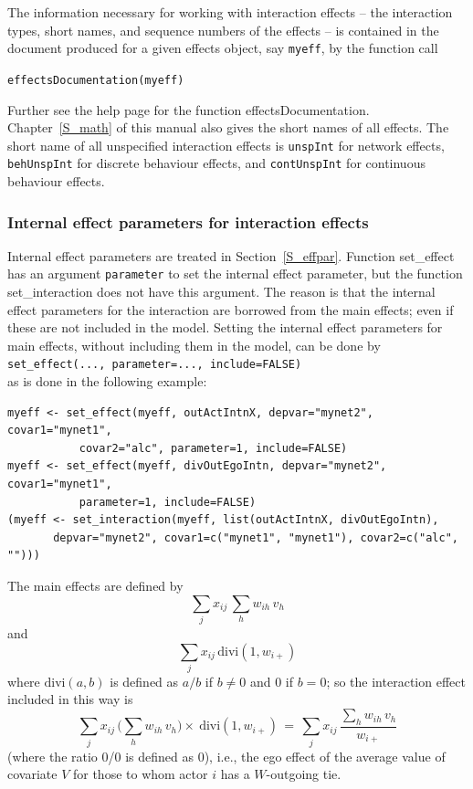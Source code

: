 \documentclass[a4paper,fleqn,11pt]{article}
\newcommand{\+}{\, + \,}
\newcommand{\sfn}[1]{\textsf{#1}}
\begin{document}
The information necessary for working with interaction effects
-- the interaction types, short names, and sequence numbers
of the effects -- is contained in the document produced
for a given effects object, say \texttt{myeff}, by the function call

\verb|effectsDocumentation(myeff)|

\noindent
Further see the help page for the function \sfn{effectsDocumentation}.
Chapter~\ref{S_math} of this manual also gives the short names of all effects.
The short name of all unspecified interaction effects is \texttt{unspInt}
for network effects, \texttt{behUnspInt} for discrete behaviour effects,
and \texttt{contUnspInt} for continuous behaviour effects.



\subsubsection{Internal effect parameters for interaction effects}
\label{intint}

Internal effect parameters are treated in Section~\ref{S_effpar}.
Function \sfn{set\_effect} has an argument \texttt{parameter} to set the
internal effect parameter, but the function  \sfn{set\_interaction} does not
have this argument. The reason is that the internal effect parameters for the
interaction are borrowed from the main effects; even if these are
not included in the model.
Setting the internal effect parameters for main effects, without including them
in the model, can be done by \\[0.2em]
\texttt{set\_effect(..., parameter=..., include=FALSE)}\\[0.2em]
 as is done in the following example:
\begin{verbatim}
myeff <- set_effect(myeff, outActIntnX, depvar="mynet2", covar1="mynet1",
           covar2="alc", parameter=1, include=FALSE)
myeff <- set_effect(myeff, divOutEgoIntn, depvar="mynet2", covar1="mynet1",
           parameter=1, include=FALSE)
(myeff <- set_interaction(myeff, list(outActIntnX, divOutEgoIntn),
       depvar="mynet2", covar1=c("mynet1", "mynet1"), covar2=c("alc", "")))
\end{verbatim}
The main effects are defined by
\[
\sum_j x_{ij}\, \sum_h w_{ih}\,v_h
\] and
\[
  \sum_j x_{ij}\, \text{divi}(1, w_{i+})
\]
where $\text{divi}(a,b)$ is defined as $a/b$ if $b \neq 0$ and 0 if $b=0$;
so the interaction effect included in this way is
\[
\sum_j x_{ij}\,  \Big( \sum_h w_{ih}\,v_h \Big) \times\ \text{divi}(1, w_{i+})
 \,=\,   \sum_j x_{ij}\, \frac{\sum_h w_{ih}\,v_h}{ w_{i+}}
\]
(where the ratio 0/0 is defined as 0), i.e., the ego effect of the
average value of covariate $V$
for those to whom actor $i$ has a $W$-outgoing tie.
\medskip
\end{document}
